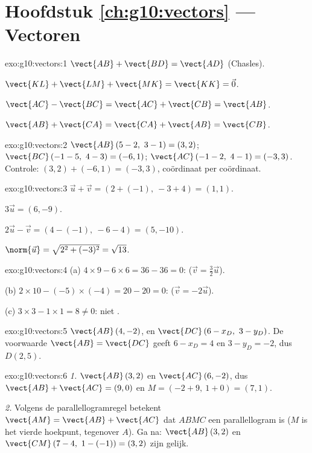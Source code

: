 \section*{Hoofdstuk \ref{ch:g10:vectors} --- Vectoren}

\begin{solution}{exo:g10:vectors:1}
$\vect{AB} + \vect{BD} = \vect{AD}$ (Chasles).

$\vect{KL} + \vect{LM} + \vect{MK} = \vect{KK} = \vec 0$.

$\vect{AC} - \vect{BC} = \vect{AC} + \vect{CB} = \vect{AB}$.

$\vect{AB} + \vect{CA} = \vect{CA} + \vect{AB} = \vect{CB}$.
\end{solution}

\begin{solution}{exo:g10:vectors:2}
$\vect{AB}\,(5-2,\ 3-1) = (3, 2)$; \quad
$\vect{BC}\,(-1-5,\ 4-3) = (-6, 1)$; \quad
$\vect{AC}\,(-1-2,\ 4-1) = (-3, 3)$.
Controle: $(3, 2) + (-6, 1) = (-3, 3)$, coördinaat per coördinaat.
\end{solution}

\begin{solution}{exo:g10:vectors:3}
$\vec u + \vec v = (2 + (-1),\ -3 + 4) = (1, 1)$.

$3\vec u = (6, -9)$.

$2\vec u - \vec v = (4 - (-1),\ -6 - 4) = (5, -10)$.

$\norm{\vec u} = \sqrt{2^2 + (-3)^2} = \sqrt{13}$.
\end{solution}

\begin{solution}{exo:g10:vectors:4}
(a) $4 \times 9 - 6 \times 6 = 36 - 36 = 0$: 
($\vec v = \frac32 \vec u$).

(b) $2 \times 10 - (-5) \times (-4) = 20 - 20 = 0$: 
($\vec v = -2\vec u$).

(c) $3 \times 3 - 1 \times 1 = 8 \neq 0$: niet .
\end{solution}

\begin{solution}{exo:g10:vectors:5}
$\vect{AB}\,(4, -2)$, en $\vect{DC}\,(6 - x_D,\ 3 - y_D)$. De voorwaarde
$\vect{AB} = \vect{DC}$ geeft $6 - x_D = 4$ en $3 - y_D = -2$, dus
$D(2, 5)$.
\end{solution}

\begin{solution}{exo:g10:vectors:6}
\emph{1.} $\vect{AB}\,(3, 2)$ en $\vect{AC}\,(6, -2)$, dus
$\vect{AB} + \vect{AC} = (9, 0)$ en $M = (-2 + 9,\ 1 + 0) = (7, 1)$.

\emph{2.} Volgens de parallellogramregel betekent
$\vect{AM} = \vect{AB} + \vect{AC}$ dat $ABMC$ een parallellogram is ($M$ is
het vierde hoekpunt, tegenover $A$). Ga na: $\vect{AB}\,(3,2)$ en
$\vect{CM}\,(7-4,\ 1-(-1)) = (3, 2)$ zijn gelijk.
\end{solution}

